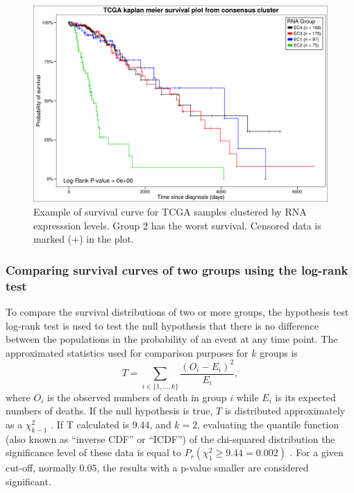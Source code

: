 \begin{figure}
\centering
\includegraphics[width=1.0\linewidth]{images/example_survival.png}
\caption[Example of survival curve.]{\label{fig:survival_example}
Example of survival curve for TCGA samples clustered by RNA expresssion levels. Group 2 has
the worst survival. Censored data is marked (+) in the plot.}
\end{figure}




\subsubsection{Comparing survival curves of two groups using the log-rank test}

 To compare the survival distributions of two or more groups,  the hypothesis test log-rank test is
 used to test the null hypothesis that there is no difference between the populations
 in the probability of an event at any time point.
%
 The approximated statistics used for comparison purposes for $k$ groups is
 $$T = \sum_{i \in \{1,\ldots,k\}}\frac{(O_i - E_i)^2}{E_i},$$
 where $O_i$ is the observed numbers of death in  group $i$
 while $E_i$ is its expected numbers of deaths.
 If the null hypothesis is true, $T$ is distributed approximately as a $\chi^2_{k-1}$ \cite{matthews1996using}.
If T calculated is $9.44$, and $k = 2$,  evaluating the quantile function (also known as “inverse CDF” or “ICDF”) of the chi-squared distribution the significance level of these data is equal to
$P_r(\chi^2_{1}\geq9.44 = 0.002)$ \cite{yau2012r}.
For a given cut-off, normally $0.05$, the results with a p-value smaller are considered significant.


